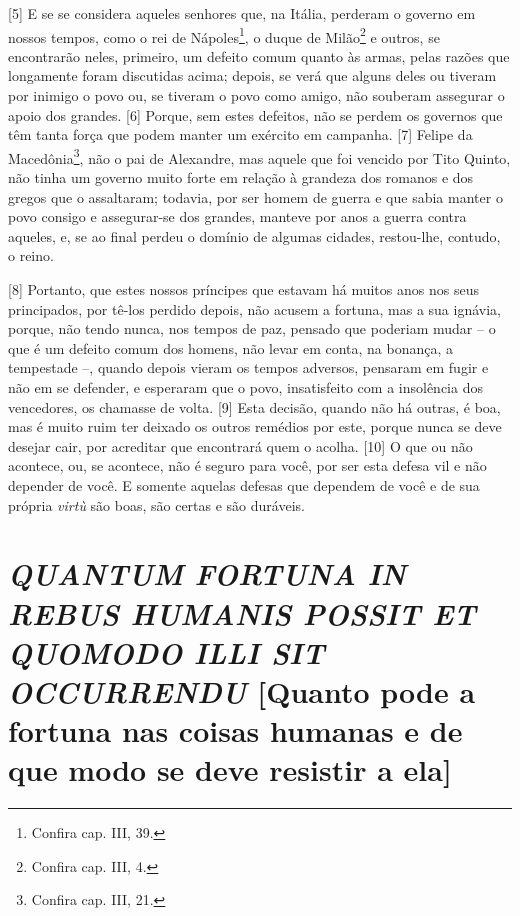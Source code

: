 {[}5{]} E se se considera aqueles senhores que, na Itália, perderam o
governo em nossos tempos, como o rei de Nápoles\footnote{Confira cap.
  III, 39.}, o duque de Milão\footnote{Confira cap. III, 4.} e outros,
se encontrarão neles, primeiro, um defeito comum quanto às armas, pelas
razões que longamente foram discutidas acima; depois, se verá que alguns
deles ou tiveram por inimigo o povo ou, se tiveram o povo como amigo,
não souberam assegurar o apoio dos grandes. {[}6{]} Porque, sem estes
defeitos, não se perdem os governos que têm tanta força que podem manter
um exército em campanha. {[}7{]} Felipe da Macedônia\footnote{Confira
  cap. III, 21.}, não o pai de Alexandre, mas aquele que foi vencido por
Tito Quinto, não tinha um governo muito forte em relação à grandeza dos
romanos e dos gregos que o assaltaram; todavia, por ser homem de guerra
e que sabia manter o povo consigo e assegurar-se dos grandes, manteve
por anos a guerra contra aqueles, e, se ao final perdeu o domínio de
algumas cidades, restou-lhe, contudo, o reino.

{[}8{]} Portanto, que estes nossos príncipes que estavam há muitos anos
nos seus principados, por tê-los perdido depois, não acusem a fortuna,
mas a sua ignávia, porque, não tendo nunca, nos tempos de paz, pensado
que poderiam mudar -- o que é um defeito comum dos homens, não levar em
conta, na bonança, a tempestade --, quando depois vieram os tempos
adversos, pensaram em fugir e não em se defender, e esperaram que o
povo, insatisfeito com a insolência dos vencedores, os chamasse de
volta. {[}9{]} Esta decisão, quando não há outras, é boa, mas é muito
ruim ter deixado os outros remédios por este, porque nunca se deve
desejar cair, por acreditar que encontrará quem o acolha. {[}10{]} O que
ou não acontece, ou, se acontece, não é seguro para você, por ser esta
defesa vil e não depender de você. E somente aquelas defesas que
dependem de você e de sua própria \emph{virtù} são boas, são certas e
são duráveis.

\quebra\section{\emph{QUANTUM FORTUNA IN REBUS HUMANIS POSSIT ET QUOMODO ILLI SIT OCCURRENDU}
{[}Quanto pode a fortuna nas coisas humanas e de que modo se deve resistir a ela{]}}

